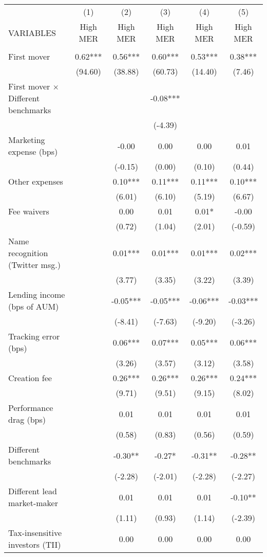 \documentclass[]{article}
\begin{document}
\begin{tabular}{lccccc} \hline
 & (1) & (2) & (3) & (4) & (5) \\
VARIABLES & High MER & High MER & High MER & High MER & High MER \\ \hline
 &  &  &  &  &  \\
First mover & 0.62*** & 0.56*** & 0.60*** & 0.53*** & 0.38*** \\
 & (94.60) & (38.88) & (60.73) & (14.40) & (7.46) \\
First mover $\times$ Different benchmarks &  &  & -0.08*** &  &  \\
 &  &  & (-4.39) &  &  \\
Marketing expense (bps) &  & -0.00 & 0.00 & 0.00 & 0.01 \\
 &  & (-0.15) & (0.00) & (0.10) & (0.44) \\
Other expenses &  & 0.10*** & 0.11*** & 0.11*** & 0.10*** \\
 &  & (6.01) & (6.10) & (5.19) & (6.67) \\
Fee waivers &  & 0.00 & 0.01 & 0.01* & -0.00 \\
 &  & (0.72) & (1.04) & (2.01) & (-0.59) \\
Name recognition (Twitter msg.) &  & 0.01*** & 0.01*** & 0.01*** & 0.02*** \\
 &  & (3.77) & (3.35) & (3.22) & (3.39) \\
Lending income (bps of AUM) &  & -0.05*** & -0.05*** & -0.06*** & -0.03*** \\
 &  & (-8.41) & (-7.63) & (-9.20) & (-3.26) \\
Tracking error (bps) &  & 0.06*** & 0.07*** & 0.05*** & 0.06*** \\
 &  & (3.26) & (3.57) & (3.12) & (3.58) \\
Creation fee &  & 0.26*** & 0.26*** & 0.26*** & 0.24*** \\
 &  & (9.71) & (9.51) & (9.15) & (8.02) \\
Performance drag (bps) &  & 0.01 & 0.01 & 0.01 & 0.01 \\
 &  & (0.58) & (0.83) & (0.56) & (0.59) \\
Different benchmarks &  & -0.30** & -0.27* & -0.31** & -0.28** \\
 &  & (-2.28) & (-2.01) & (-2.28) & (-2.27) \\
Different lead market-maker &  & 0.01 & 0.01 & 0.01 & -0.10** \\
 &  & (1.11) & (0.93) & (1.14) & (-2.39) \\
Tax-insensitive investors (TII) &  & 0.00 & 0.00 & 0.00 & 0.00 \\

\end{tabular}
\end{document}
